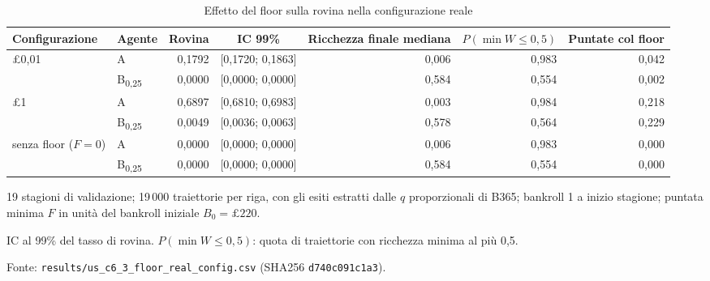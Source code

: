 \begin{table}[htbp]
\centering
\small
\caption{Effetto del floor sulla rovina nella configurazione reale}
\label{tab:floor_reale}
\begin{tabular}{llrcrrr}
\toprule
Configurazione & Agente & Rovina & IC 99\% & Ricchezza finale mediana & $P(\min W \le 0{,}5)$ & Puntate col floor \\
\midrule
\pounds{}0,01 & A & 0,1792 & [0,1720; 0,1863] & 0,006 & 0,983 & 0,042 \\
 & B\textsubscript{0,25} & 0,0000 & [0,0000; 0,0000] & 0,584 & 0,554 & 0,002 \\
\midrule
\pounds{}1 & A & 0,6897 & [0,6810; 0,6983] & 0,003 & 0,984 & 0,218 \\
 & B\textsubscript{0,25} & 0,0049 & [0,0036; 0,0063] & 0,578 & 0,564 & 0,229 \\
\midrule
senza floor ($F = 0$) & A & 0,0000 & [0,0000; 0,0000] & 0,006 & 0,983 & 0,000 \\
 & B\textsubscript{0,25} & 0,0000 & [0,0000; 0,0000] & 0,584 & 0,554 & 0,000 \\
\bottomrule
\end{tabular}

\smallskip
\begin{minipage}{\linewidth}
\footnotesize
19 stagioni di validazione; 19\,000 traiettorie per riga, con gli esiti estratti dalle $q$ proporzionali di B365; bankroll 1 a inizio stagione; puntata minima $F$ in unità del bankroll iniziale $B_0 = \pounds{}220$.\par
IC al 99\% del tasso di rovina. $P(\min W \le 0{,}5)$: quota di traiettorie con ricchezza minima al più 0,5.\par
Fonte: \texttt{results/us\_c6\_3\_floor\_real\_config.csv} (SHA256 \texttt{d740c091c1a3}).
\end{minipage}
\end{table}
